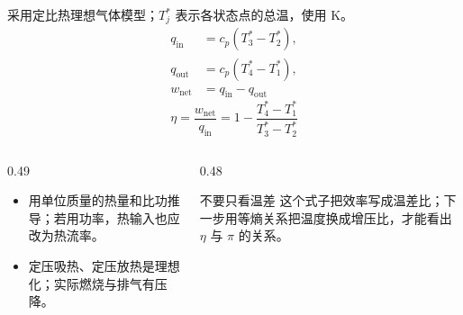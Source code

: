 \begin{frame}[t,shrink]{}
采用定比热理想气体模型；\(T_j^*\) 表示各状态点的总温，使用 \(\mathrm{K}\)。
$$
\begin{aligned}
q_{\mathrm{in}}&=c_p\left(T_3^*-T_2^*\right),\\
q_{\mathrm{out}}&=c_p\left(T_4^*-T_1^*\right),\\
w_{\mathrm{net}}&=q_{\mathrm{in}}-q_{\mathrm{out}}
\end{aligned}
$$
$$
\eta=\frac{w_{\mathrm{net}}}{q_{\mathrm{in}}}
=1-\frac{T_4^*-T_1^*}{T_3^*-T_2^*}
$$
\begin{columns}[T,onlytextwidth]
\begin{column}{0.49\textwidth}
  \begin{itemize}
    \item 用单位质量的热量和比功推导；若用功率，热输入也应改为热流率。
    \item 定压吸热、定压放热是理想化；实际燃烧与排气有压降。
  \end{itemize}
\end{column}
\begin{column}{0.48\textwidth}
  \begin{keybox}{不要只看温差}
  \small 这个式子把效率写成温差比；下一步用等熵关系把温度换成增压比，才能看出 \(\eta\) 与 \(\pi\) 的关系。
  \end{keybox}
\end{column}
\end{columns}
\end{frame}

